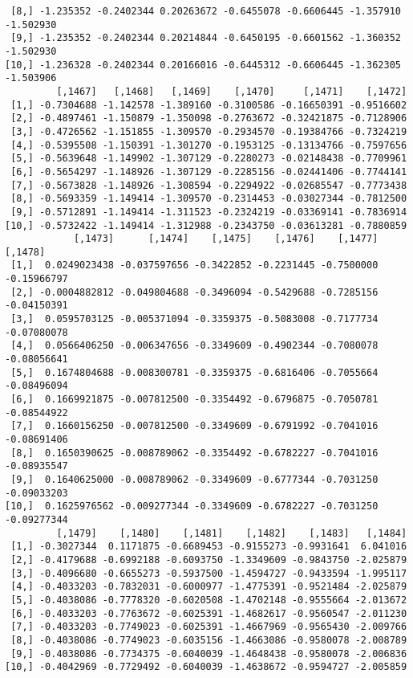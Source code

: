 \documentclass[
  letterpaper,
  DIV=11,
  numbers=noendperiod]{scrreprt}
\begin{document}
\begin{verbatim}
 [8,] -1.235352 -0.2402344 0.20263672 -0.6455078 -0.6606445 -1.357910 -1.502930
 [9,] -1.235352 -0.2402344 0.20214844 -0.6450195 -0.6601562 -1.360352 -1.502930
[10,] -1.236328 -0.2402344 0.20166016 -0.6445312 -0.6606445 -1.362305 -1.503906
         [,1467]   [,1468]   [,1469]    [,1470]     [,1471]    [,1472]
 [1,] -0.7304688 -1.142578 -1.389160 -0.3100586 -0.16650391 -0.9516602
 [2,] -0.4897461 -1.150879 -1.350098 -0.2763672 -0.32421875 -0.7128906
 [3,] -0.4726562 -1.151855 -1.309570 -0.2934570 -0.19384766 -0.7324219
 [4,] -0.5395508 -1.150391 -1.301270 -0.1953125 -0.13134766 -0.7597656
 [5,] -0.5639648 -1.149902 -1.307129 -0.2280273 -0.02148438 -0.7709961
 [6,] -0.5654297 -1.148926 -1.307129 -0.2285156 -0.02441406 -0.7744141
 [7,] -0.5673828 -1.148926 -1.308594 -0.2294922 -0.02685547 -0.7773438
 [8,] -0.5693359 -1.149414 -1.309570 -0.2314453 -0.03027344 -0.7812500
 [9,] -0.5712891 -1.149414 -1.311523 -0.2324219 -0.03369141 -0.7836914
[10,] -0.5732422 -1.149414 -1.312988 -0.2343750 -0.03613281 -0.7880859
            [,1473]      [,1474]    [,1475]    [,1476]    [,1477]     [,1478]
 [1,]  0.0249023438 -0.037597656 -0.3422852 -0.2231445 -0.7500000 -0.15966797
 [2,] -0.0004882812 -0.049804688 -0.3496094 -0.5429688 -0.7285156 -0.04150391
 [3,]  0.0595703125 -0.005371094 -0.3359375 -0.5083008 -0.7177734 -0.07080078
 [4,]  0.0566406250 -0.006347656 -0.3349609 -0.4902344 -0.7080078 -0.08056641
 [5,]  0.1674804688 -0.008300781 -0.3359375 -0.6816406 -0.7055664 -0.08496094
 [6,]  0.1669921875 -0.007812500 -0.3354492 -0.6796875 -0.7050781 -0.08544922
 [7,]  0.1660156250 -0.007812500 -0.3349609 -0.6791992 -0.7041016 -0.08691406
 [8,]  0.1650390625 -0.008789062 -0.3354492 -0.6782227 -0.7041016 -0.08935547
 [9,]  0.1640625000 -0.008789062 -0.3349609 -0.6777344 -0.7031250 -0.09033203
[10,]  0.1625976562 -0.009277344 -0.3349609 -0.6782227 -0.7031250 -0.09277344
         [,1479]    [,1480]    [,1481]    [,1482]    [,1483]   [,1484]
 [1,] -0.3027344  0.1171875 -0.6689453 -0.9155273 -0.9931641  6.041016
 [2,] -0.4179688 -0.6992188 -0.6093750 -1.3349609 -0.9843750 -2.025879
 [3,] -0.4096680 -0.6655273 -0.5937500 -1.4594727 -0.9433594 -1.995117
 [4,] -0.4033203 -0.7832031 -0.6000977 -1.4775391 -0.9521484 -2.025879
 [5,] -0.4038086 -0.7778320 -0.6020508 -1.4702148 -0.9555664 -2.013672
 [6,] -0.4033203 -0.7763672 -0.6025391 -1.4682617 -0.9560547 -2.011230
 [7,] -0.4033203 -0.7749023 -0.6025391 -1.4667969 -0.9565430 -2.009766
 [8,] -0.4038086 -0.7749023 -0.6035156 -1.4663086 -0.9580078 -2.008789
 [9,] -0.4038086 -0.7734375 -0.6040039 -1.4648438 -0.9580078 -2.006836
[10,] -0.4042969 -0.7729492 -0.6040039 -1.4638672 -0.9594727 -2.005859

\end{verbatim}
\end{document}
